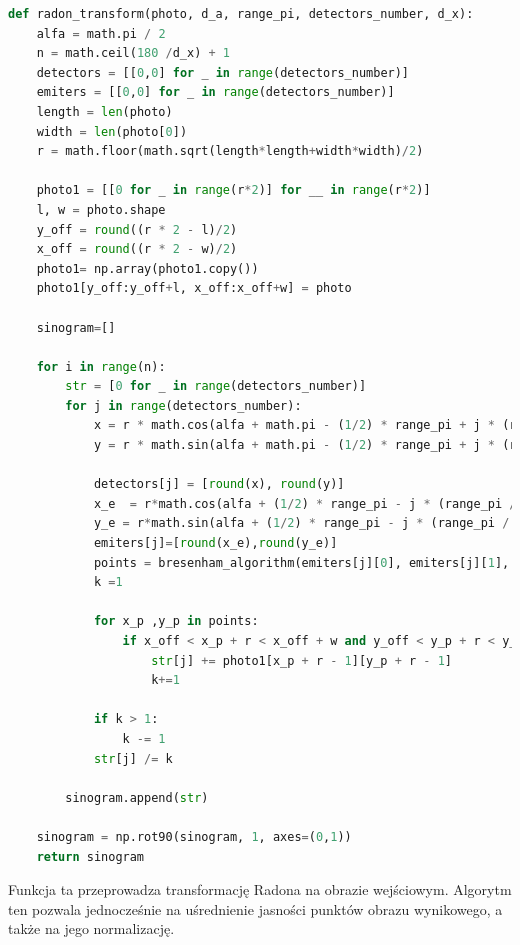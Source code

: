 \documentclass[11pt,a4paper]{article}
\begin{document}
\begin{lstlisting}[language=Python, basicstyle=\normal, breaklines=true]
def radon_transform(photo, d_a, range_pi, detectors_number, d_x):
    alfa = math.pi / 2
    n = math.ceil(180 /d_x) + 1
    detectors = [[0,0] for _ in range(detectors_number)]
    emiters = [[0,0] for _ in range(detectors_number)]
    length = len(photo)
    width = len(photo[0])
    r = math.floor(math.sqrt(length*length+width*width)/2)

    photo1 = [[0 for _ in range(r*2)] for __ in range(r*2)]
    l, w = photo.shape
    y_off = round((r * 2 - l)/2)
    x_off = round((r * 2 - w)/2)
    photo1= np.array(photo1.copy())
    photo1[y_off:y_off+l, x_off:x_off+w] = photo

    sinogram=[]

    for i in range(n):
        str = [0 for _ in range(detectors_number)]
        for j in range(detectors_number):
            x = r * math.cos(alfa + math.pi - (1/2) * range_pi + j * (range_pi / (detectors_number - 1)) + (i * d_a))
            y = r * math.sin(alfa + math.pi - (1/2) * range_pi + j * (range_pi / (detectors_number - 1)) + (i * d_a))

            detectors[j] = [round(x), round(y)]
            x_e  = r*math.cos(alfa + (1/2) * range_pi - j * (range_pi / (detectors_number - 1)) + (i * d_a))
            y_e = r*math.sin(alfa + (1/2) * range_pi - j * (range_pi / (detectors_number - 1)) + (i * d_a))
            emiters[j]=[round(x_e),round(y_e)]
            points = bresenham_algorithm(emiters[j][0], emiters[j][1], detectors[j][0], detectors[j][1])
            k =1

            for x_p ,y_p in points:
                if x_off < x_p + r < x_off + w and y_off < y_p + r < y_off + l:
                    str[j] += photo1[x_p + r - 1][y_p + r - 1]
                    k+=1

            if k > 1:
                k -= 1
            str[j] /= k

        sinogram.append(str)

    sinogram = np.rot90(sinogram, 1, axes=(0,1))
    return sinogram
\end{lstlisting}
    Funkcja ta przeprowadza transformację Radona na obrazie wejściowym.
    Algorytm ten pozwala jednocześnie na uśrednienie jasności punktów obrazu wynikowego, a także na jego normalizację.
\end{document}
